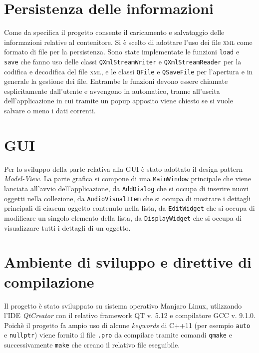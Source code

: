     \section*{Persistenza delle informazioni}
        Come da specifica il progetto consente il caricamento e salvataggio delle informazioni relative al contenitore. Si è scelto di adottare l'uso dei file \textsc{xml} come formato di file per la persistenza. \newline
        Sono state implementate le funzioni \texttt{load} e \texttt{save} che fanno uso delle classi \texttt{QXmlStreamWriter} e \texttt{QXmlStreamReader} per la codifica e decodifica del file \textsc{xml}, e le classi \texttt{QFile} e \texttt{QSaveFile} per l'apertura e in generale la gestione dei file. \newline
        Entrambe le funzioni devono essere chiamate esplicitamente dall'utente e avvengono in automatico, tranne all'uscita dell'applicazione in cui tramite un popup apposito viene chiesto se si vuole salvare o meno i dati correnti.

    \section*{GUI}
        Per lo sviluppo della parte relativa alla GUI è stato adottato il design pattern \textit{Model-View}. \newline
        La parte grafica si compone di una \texttt{MainWindow} principale che viene lanciata all'avvio dell'applicazione, da \texttt{AddDialog} che si occupa di inserire nuovi oggetti nella collezione, da \texttt{AudioVisualItem} che si occupa di mostrare i dettagli principali di ciascun oggetto contenuto nella lista, da \texttt{EditWidget} che si occupa di modificare un singolo elemento della lista, da \texttt{DisplayWidget} che si occupa di visualizzare tutti i dettagli di un oggetto. \newline


    \section*{Ambiente di sviluppo e direttive di compilazione}
        Il progetto è stato sviluppato su sistema operativo Manjaro Linux, utlizzando l'IDE \textit{QtCreator} con il relativo framework QT v. 5.12 e compilatore GCC v. 9.1.0. \newline
        Poichè il progetto fa ampio uso di alcune \textit{keywords} di C++11 (per esempio \texttt{auto} e \texttt{nullptr}) viene fornito il file \texttt{.pro} da compilare tramite comandi \texttt{qmake} e successivamente \texttt{make} che creano il relativo file eseguibile.

